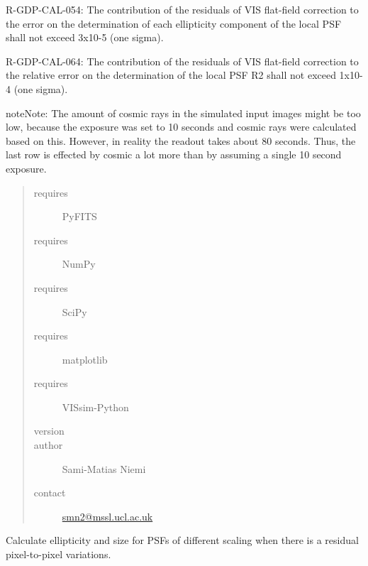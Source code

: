 \documentclass[a4paper,12pt,english]{sphinxmanual}
\begin{document}
R-GDP-CAL-054:
The contribution of the residuals of VIS flat-field correction to the error on the determination of each
ellipticity component of the local PSF shall not exceed 3x10-5 (one sigma).

R-GDP-CAL-064:
The contribution of the residuals of VIS flat-field correction to the relative error on the determination
of the local PSF R2 shall not exceed 1x10-4 (one sigma).

\begin{notice}{note}{Note:}
The amount of cosmic rays in the simulated input images might be too low, because the exposure was
set to 10 seconds and cosmic rays were calculated based on this. However, in reality the readout
takes about 80 seconds. Thus, the last row is effected by cosmic a lot more than by assuming a single
10 second exposure.
\end{notice}
\begin{quote}\begin{description}
\item[{requires}] \leavevmode
PyFITS

\item[{requires}] \leavevmode
NumPy

\item[{requires}] \leavevmode
SciPy

\item[{requires}] \leavevmode
matplotlib

\item[{requires}] \leavevmode
VISsim-Python

\item[{version}] 

\item[{author}] \leavevmode
Sami-Matias Niemi

\item[{contact}] \leavevmode
\href{mailto:smn2@mssl.ucl.ac.uk}{smn2@mssl.ucl.ac.uk}

\end{description}\end{quote}

\begin{fulllineitems}
\label{reduction:analysis.FlatfieldCalibration.findTolerableError}
Calculate ellipticity and size for PSFs of different scaling when there is a residual
pixel-to-pixel variations.

\end{fulllineitems}
\end{document}
